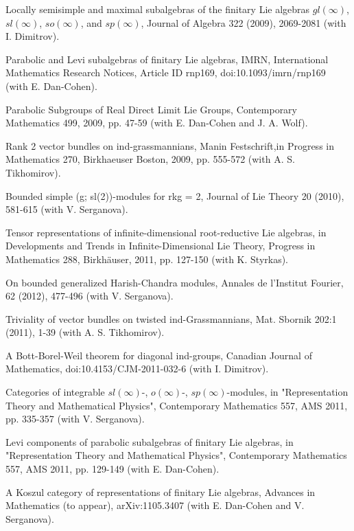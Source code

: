 \myss \label{45.} Locally semisimple and maximal subalgebras of the finitary Lie algebras $gl(\infty)$, $sl(\infty)$, $so(\infty)$, and $sp(\infty)$, Journal of Algebra 322 (2009), 2069-2081 (with I. Dimitrov).

\myss \label{46.} Parabolic and Levi subalgebras of finitary Lie algebras, IMRN, International Mathematics Research Notices, Article ID rnp169, doi:10.1093/imrn/rnp169 (with E. Dan-Cohen).

\myss \label{47.} Parabolic Subgroups of Real Direct Limit Lie Groups, Contemporary Mathematics 499, 2009, pp. 47-59 (with E. Dan-Cohen and J. A. Wolf).

\myss \label{48.} Rank 2 vector bundles on ind-grassmannians, Manin Festschrift,in Progress in Mathematics 270, Birkhaeuser Boston, 2009, pp. 555-572 (with A. S. Tikhomirov).

\myss \label{49.} Bounded simple (g; sl(2))-modules for rkg = 2, Journal of Lie Theory 20 (2010), 581-615 (with V. Serganova).

\myss \label{50.} Tensor representations of infinite-dimensional root-reductive Lie algebras, in Developments and Trends in Infinite-Dimensional Lie Theory, Progress in Mathematics 288, Birkh\"auser, 2011, pp. 127-150 (with K. Styrkas).

\myss \label{51.} On bounded generalized Harish-Chandra modules, Annales de l'Institut Fourier, 62 (2012), 477-496 (with V. Serganova).

\myss \label{52.} Triviality of vector bundles on twisted ind-Grassmannians, Mat. Sbornik 202:1 (2011), 1-39 (with A. S. Tikhomirov).

\myss \label{53.} A Bott-Borel-Weil theorem for diagonal ind-groups, Canadian Journal of Mathematics, doi:10.4153/CJM-2011-032-6 (with I. Dimitrov).

\myss \label{54.} Categories of integrable $sl(\infty)$-, $o(\infty)$-, $sp(\infty)$-modules, in "Representation Theory and Mathematical Physics", Contemporary Mathematics 557, AMS 2011, pp. 335-357 (with V. Serganova).

\myss \label{55.} Levi components of parabolic subalgebras of finitary Lie algebras, in "Representation Theory and Mathematical Physics", Contemporary Mathematics 557, AMS 2011, pp. 129-149 (with E. Dan-Cohen).

\myss \label{56.} A Koszul category of representations of finitary Lie algebras, Advances in Mathematics (to appear), arXiv:1105.3407 (with E. Dan-Cohen and V. Serganova).

